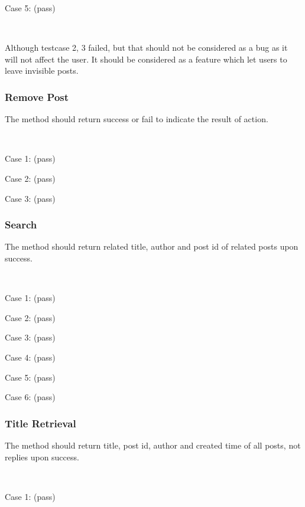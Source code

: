 Case 5: (pass)


~

Although testcase 2, 3 failed, but that should not be considered as a bug as it will not affect the user. It should be considered as a feature which let users to leave invisible posts.

\subsubsection{Remove Post}
The method should return success or fail to indicate the result of action.

~

Case 1: (pass)


Case 2: (pass)


Case 3: (pass)


\subsubsection{Search}
The method should return related title, author and post id of related posts upon success.

~

Case 1: (pass)


Case 2: (pass)


Case 3: (pass)


Case 4: (pass)


Case 5: (pass)


Case 6: (pass)


\subsubsection{Title Retrieval}
The method should return title, post id, author and created time of all posts, not replies upon success.

~

Case 1: (pass)

